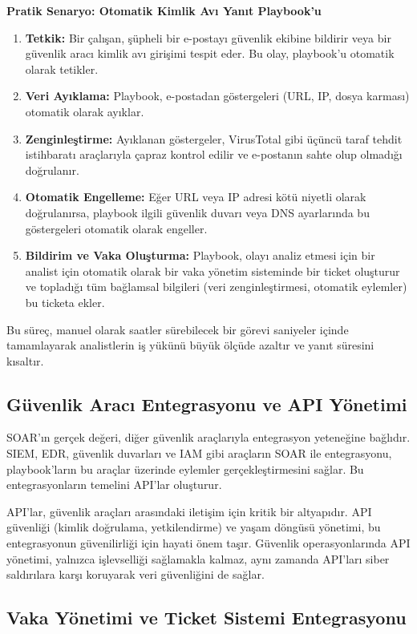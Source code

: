 \textbf{Pratik Senaryo: Otomatik Kimlik Avı Yanıt Playbook'u}

\begin{enumerate}
    \item \textbf{Tetkik:} Bir çalışan, şüpheli bir e-postayı güvenlik ekibine bildirir veya bir güvenlik aracı kimlik avı girişimi tespit eder. Bu olay, playbook'u otomatik olarak tetikler.
    \item \textbf{Veri Ayıklama:} Playbook, e-postadan göstergeleri (URL, IP, dosya karması) otomatik olarak ayıklar.
    \item \textbf{Zenginleştirme:} Ayıklanan göstergeler, VirusTotal gibi üçüncü taraf tehdit istihbaratı araçlarıyla çapraz kontrol edilir ve e-postanın sahte olup olmadığı doğrulanır.
    \item \textbf{Otomatik Engelleme:} Eğer URL veya IP adresi kötü niyetli olarak doğrulanırsa, playbook ilgili güvenlik duvarı veya DNS ayarlarında bu göstergeleri otomatik olarak engeller.
    \item \textbf{Bildirim ve Vaka Oluşturma:} Playbook, olayı analiz etmesi için bir analist için otomatik olarak bir vaka yönetim sisteminde bir ticket oluşturur ve topladığı tüm bağlamsal bilgileri (veri zenginleştirmesi, otomatik eylemler) bu ticketa ekler.
\end{enumerate}

Bu süreç, manuel olarak saatler sürebilecek bir görevi saniyeler içinde tamamlayarak analistlerin iş yükünü büyük ölçüde azaltır ve yanıt süresini kısaltır.

\subsection{Güvenlik Aracı Entegrasyonu ve API Yönetimi}

SOAR'ın gerçek değeri, diğer güvenlik araçlarıyla entegrasyon yeteneğine bağlıdır. SIEM, EDR, güvenlik duvarları ve IAM gibi araçların SOAR ile entegrasyonu, playbook'ların bu araçlar üzerinde eylemler gerçekleştirmesini sağlar. Bu entegrasyonların temelini API'lar oluşturur.

API'lar, güvenlik araçları arasındaki iletişim için kritik bir altyapıdır. API güvenliği (kimlik doğrulama, yetkilendirme) ve yaşam döngüsü yönetimi, bu entegrasyonun güvenilirliği için hayati önem taşır. Güvenlik operasyonlarında API yönetimi, yalnızca işlevselliği sağlamakla kalmaz, aynı zamanda API'ları siber saldırılara karşı koruyarak veri güvenliğini de sağlar.

\subsection{Vaka Yönetimi ve Ticket Sistemi Entegrasyonu}

